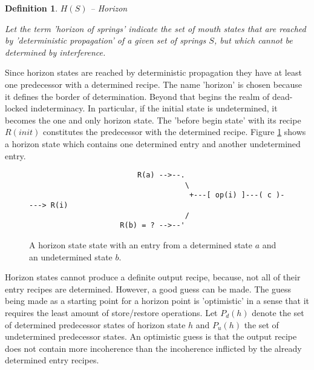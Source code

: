 \documentclass[12pt,a4paper]{scrartcl}
\newtheorem{definition}{Definition}
\begin{document}
\begin{definition} $H(S)$ -- Horizon

    Let the term 'horizon of springs' indicate the set of mouth states that are
    reached by 'deterministic propagation' of a given set of springs $S$, but
    which cannot be determined by interference.

\end{definition}

Since horizon states are reached by deterministic propagation they have at least
one predecessor with a determined recipe.  The name 'horizon' is chosen because
it defines the border of determination.  Beyond that begins the realm of
dead-locked indeterminacy.  In particular, if the initial state is undetermined, it becomes
the one and only horizon state. The 'before begin state' with its recipe
$R(init)$ constitutes the predecessor with the determined recipe.  Figure
\ref{fig:horizon-state} shows a horizon state which contains one determined
entry and another undetermined entry. 

\begin{figure}[htbp] \leavevmode \label{fig:horizon-state}
\begin{verbatim}
                         R(a) -->--.
                                    \
                                     +---[ op(i) ]---( c )----> R(i)
                                    /
                     R(b) = ? -->--'

\end{verbatim}
\caption{A horizon state state with an entry from a determined state $a$ and 
    an undetermined state $b$.}
\end{figure}

Horizon states cannot produce a definite output recipe, because, not all of
their entry recipes are determined. However, a good guess can be made.  The
guess being made as a starting point for a horizon point is 'optimistic' in a sense
that it requires the least amount of store/restore operations. Let $P_d(h)$
denote the set of determined predecessor states of horizon state $h$ and
$P_u(h)$ the set of undetermined predecessor states. An optimistic guess is
that the output recipe does not contain more incoherence than the incoherence
inflicted by the already determined entry recipes.
\end{document}
